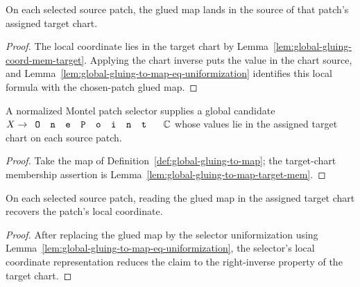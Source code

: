 \begin{lemma}
\label{lem:global-gluing-to-map-target-mem}
On each selected source patch, the glued map lands in the source of that
patch's assigned target chart.
\leanok
\end{lemma}
\begin{proof}\leanok
The local coordinate lies in the target chart by
Lemma~\ref{lem:global-gluing-coord-mem-target}. Applying the chart inverse
puts the value in the chart source, and
Lemma~\ref{lem:global-gluing-to-map-eq-uniformization} identifies this local
formula with the chosen-patch glued map.
\end{proof}

\begin{lemma}
\label{lem:global-gluing-to-map-exists}
A normalized Montel patch selector supplies a global candidate
\(X\to\code{OnePoint}\,\C\) whose values lie in the assigned target chart on
each source patch.
\leanok
\end{lemma}
\begin{proof}\leanok
Take the map of Definition~\ref{def:global-gluing-to-map}; the target-chart
membership assertion is Lemma~\ref{lem:global-gluing-to-map-target-mem}.
\end{proof}

\begin{lemma}
\label{lem:global-gluing-chart-expression}
On each selected source patch, reading the glued map in the assigned target
chart recovers the patch's local coordinate.
\leanok
\end{lemma}
\begin{proof}\leanok
After replacing the glued map by the selector uniformization using
Lemma~\ref{lem:global-gluing-to-map-eq-uniformization}, the selector's local
coordinate representation reduces the claim to the right-inverse property of
the target chart.
\end{proof}

